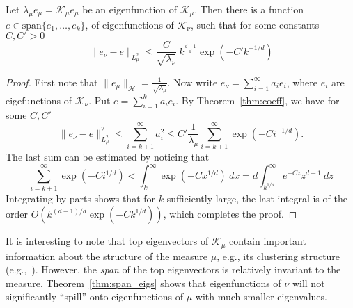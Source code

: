 \documentclass[final,12pt]{colt2018}
\renewcommand{\H}{\mathcal{H}}
\newcommand{\K}{\mathcal{K_\mu}}
\newcommand{\Kn}{\mathcal{K_\nu}}
\newcommand{\A}{\mathcal{A}}
\newcommand{\LL}{{L^2_\mu}}
\begin{document}
\begin{theorem}\label{thm:span_eigs} Let $\lambda_\mu e_\mu = \K e_\mu$  be an eigenfunction of $\K$. Then there is a function $e \in  \mathrm{span}\{e_1,\ldots,e_k\}$, of eigenfunctions of $\Kn$, such that 
for some constants $C,C'>0$
$$
\|e_\nu - e \|_\LL  \le \frac{C}{\sqrt{\lambda_\nu}}~  k^{\frac{d-1}{d}} \exp(-C' k^{-1/d})
$$ 
\end{theorem}
\begin{proof}
First note  that $\|e_\mu\|_\H = \frac{1}{\sqrt{\lambda_\mu}}$. Now write $e_\nu = \sum_{i=1}^\infty a_i e_i$, where $e_i$ are eigefunctions of $\Kn$. Put $e = \sum_{i=1}^k a_i e_i$.
By Theorem~\ref{thm:coeff}, we have for some $C,C'$
$$
\|e_\nu - e\|_\LL^2 \le \sum_{i={k+1}}^\infty a_i^2 \le C'\frac{1}{{\lambda_\mu}} \sum_{i={k+1}}^\infty \exp(-C i^{-1/d}).
$$ 
The last sum can be estimated by noticing that 
$$
\sum_{i={k+1}}^\infty \exp(-C i^{1/d}) < \int_{{k}}^\infty \exp(-C x^{1/d})~dx = d\int_{k^{1/d}}^\infty e^{-C  z} z^{d-1}~d z
$$
Integrating by parts shows that for $k$ sufficiently large, the last integral is of the order $O(k^{(d-1)/d} \exp(-Ck^{1/d}))$, which completes the proof.
\end{proof}
\begin{remark} 
It is interesting to note that 
top eigenvectors of $\K$ contain important information about the  structure of the measure $\mu$, e.g., its clustering structure (e.g.,~\cite{DS_AOS_09}). However, the {\it span} of the top eigenvectors is relatively invariant to the measure. Theorem~\ref{thm:span_eigs} shows that eigenfunctions of $\nu$ will not significantly ``spill'' onto eigenfunctions of $\mu$ with much smaller eigenvalues.
 \end{remark}



\end{document}

